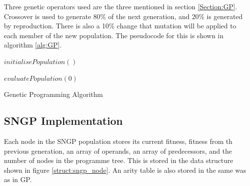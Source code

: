 \documentclass{article}
\begin{document}
Three genetic operators used are the three mentioned in section \ref{Section:GP}. Crossover is used to generate 80\% of the next generation, and 20\% is generated by reproduction. There is also a 10\% change that mutation will be applied to each member of the new population. The pseudocode for this is shown in algorithm \ref{alg:GP}.

\begin{algorithm}[H]
	
	$initialisePopulation()$
	
	$evaluatePopulation(0)$
	
	
	
	\caption{Genetic Programming Algorithm}
	
	\label{alg:GP}
\end{algorithm}

\subsection{SNGP Implementation}

Each node in the SNGP population stores its current fitness, fitness from th previous generation, an array of operands, an array of predecessors, and the number of nodes in the programme tree. This is stored in the data structure shown in figure \ref{struct:sngp_node}. An arity table is also stored in the same was as in GP.
\end{document}
